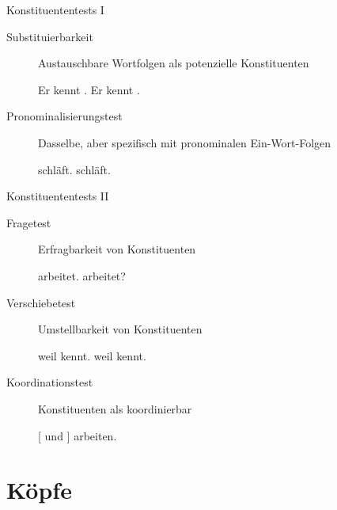 \begin{frame}
  {Konstituententests I}
  \onslide<+->
  \onslide<+->
  \begin{description}
  \item[Substituierbarkeit]
    Austauschbare Wortfolgen als potenzielle Konstituenten
    \onslide<+->
    \begin{exe}
      \ex Er kennt .
      \ex Er kennt .
    \end{exe}
    \Zeile
    \onslide<+->
  \item[Pronominalisierungstest]
    Dasselbe, aber spezifisch mit pronominalen Ein-Wort-Folgen
    \onslide<+->
    \begin{exe}
      \ex {} schläft.
      \ex {} schläft.
    \end{exe}
  \end{description}
\end{frame}

\begin{frame}
  {Konstituententests II}
  \onslide<+->
  \onslide<+->
  \begin{description}
    \item[Fragetest]
    Erfragbarkeit von Konstituenten
    \onslide<+->
      \begin{exe}
        \ex {} arbeitet.
        \ex {} arbeitet?
      \end{exe}
      \onslide<+->
      \Halbzeile
  \item[Verschiebetest] 
   Umstellbarkeit von Konstituenten 
   \onslide<+->
      \begin{exe}
        \ex weil   kennt.
        \ex weil   kennt.
      \end{exe}
      \Halbzeile
      \onslide<+->
  \item[Koordinationstest]
    Konstituenten als koordinierbar
    \onslide<+->
      \begin{exe}
        \ex \alert{[} \alert{und} \alert{]} arbeiten.
      \end{exe}
    \end{description}
\end{frame}

\section{Köpfe}

